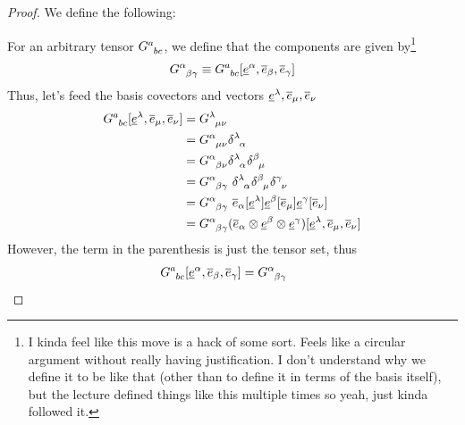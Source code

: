 \begin{solution_pset}
\begin{enumerate}[(1)]
				\begin{proof}

					We define the following: 

					For an arbitrary tensor $G\indices{^a_{bc}}$,
					we define that the components are given by\footnote{
						I kinda feel like this move is a hack of some sort.
						Feels like a circular argument without really having justification.
						I don't understand why we define it to be like that (other 
						than to define it in terms of the basis itself), but the lecture defined things like
						this multiple times so yeah, just kinda followed it.
					}
					\[
						G\indices{^\alpha_{\beta\gamma}}
						\equiv
						G\indices{^a_{bc}} 
						[
							\und e^\alpha,
							\ovr e_\beta,
							\ovr e_\gamma
						]
					\]
					Thus, let's feed the basis covectors and vectors $
							\underline{e}^\lambda,
							\overline{e}_\mu,
							\overline{e}_\nu
					$
					\begin{align*}
						G\indices{^a_{bc}} 
						[
							\und e^\lambda,
							\ovr e_\mu,
							\ovr e_\nu
						]
						&=
						G\indices{^\lambda_{\mu\nu}}
						\\
						&=
						G\indices{^\alpha_{\mu\nu}}
						\delta\indices{^\lambda_\alpha}
						\\
						&=
						G\indices{^\alpha_{\beta\nu}}
						\delta\indices{^\lambda_\alpha}
						\delta\indices{^\beta_\mu}
						\\
						&=
						G\indices{^\alpha_{\beta\gamma}}\ 
						\delta\indices{^\lambda_\alpha}
						\delta\indices{^\beta_\mu}
						\delta\indices{^\gamma_\nu}
						\\
						&=
						G\indices{^\alpha_{\beta\gamma}}\ 
						\ovr e_{\alpha}
						[\und e^\lambda]
						\und e^{\beta}
						[\ovr e_\mu]
						\und e^{\gamma}
						[\ovr e_\nu]
						\\
						&=
						G\indices{^\alpha_{\beta\gamma}}
						(
							\ovr e_\alpha \otimes 
							\und e^\beta \otimes 
							\und e^\gamma
						)
						[
							\und e^\lambda,
							\ovr e_\mu,
							\ovr e_\nu
						]
					\end{align*}
					However, the term in the parenthesis is just
					the tensor set,
					thus
					\begin{align*}
						G\indices{^a_{bc}} 
						[
							\und e^\alpha,
							\ovr e_\beta,
							\ovr e_\gamma
						]
						&=
						G\indices{^\alpha_{\beta\gamma}}\ 

\end{align*}
\end{proof}
\end{enumerate}
\end{solution_pset}
